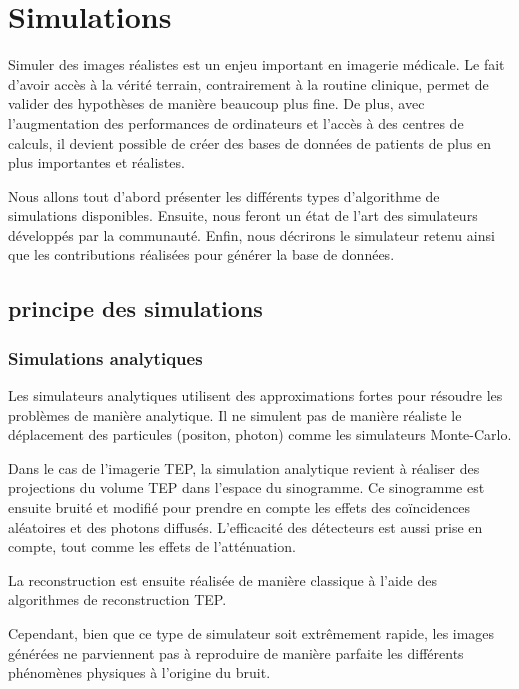 \chapter{Simulations}

Simuler des images réalistes est un enjeu important en imagerie médicale. Le fait d'avoir accès à la vérité terrain, contrairement à la routine clinique, permet de valider des hypothèses de manière beaucoup plus fine. De plus, avec l'augmentation des performances de ordinateurs et l'accès à des centres de calculs, il devient possible de créer des bases de données de patients de plus en plus importantes et réalistes.

Nous allons tout d'abord présenter les différents types d'algorithme de simulations disponibles. Ensuite, nous feront un état de l'art des simulateurs développés par la communauté. Enfin, nous décrirons le simulateur retenu ainsi que les contributions réalisées pour générer la base de données.

	\section{principe des simulations}

		\subsection{Simulations analytiques}

Les simulateurs analytiques utilisent des approximations fortes pour résoudre les problèmes de manière analytique. Il ne simulent pas de manière réaliste le déplacement des particules (positon, photon) comme les simulateurs Monte-Carlo.

Dans le cas de l'imagerie TEP, la simulation analytique revient à réaliser des projections du volume TEP dans l'espace du sinogramme. Ce sinogramme est ensuite bruité et modifié pour prendre en compte les effets des coïncidences aléatoires et des photons diffusés. L'efficacité des détecteurs est aussi prise en compte, tout comme les effets de l'atténuation. 

La reconstruction est ensuite réalisée de manière classique à l'aide des algorithmes de reconstruction TEP.


Cependant, bien que ce type de simulateur soit extrêmement rapide, les images générées ne parviennent pas à reproduire de manière parfaite les différents phénomènes physiques à l'origine du bruit.




